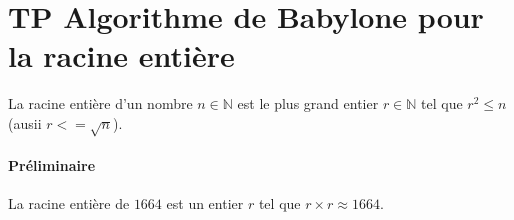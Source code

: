 %	 


\newpage
\section{TP Algorithme de Babylone pour la racine entière}
La racine entière d'un nombre $n\in\mathbb{N}$ est le plus grand entier $r\in\mathbb{N}$ tel que $r^2\leqslant n$ (ausii $r<=\sqrt{n}$).

\paragraph{Préliminaire} La racine entière de $1664$ est un entier $r$ tel que $r\times r \approx 1664$.

